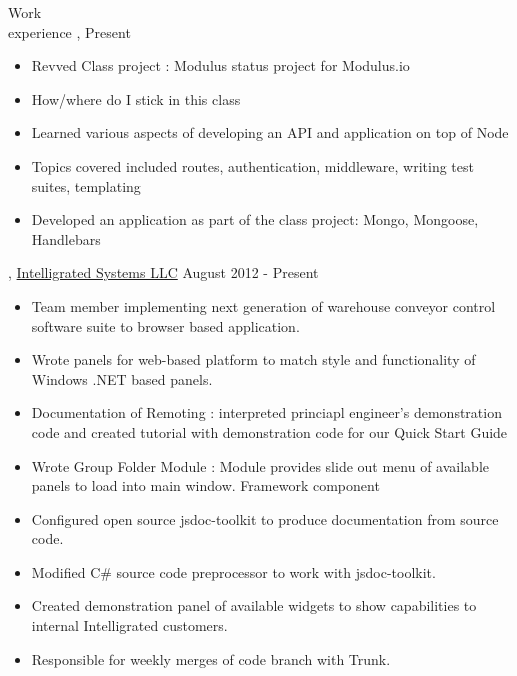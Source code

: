 \begin{category}{Work \\experience}
, Present
\begin{itemize}
\item Revved Class project : Modulus status project for Modulus.io 
\item How/where do I stick in this class
\item Learned various aspects of developing an API and application on top of Node
\item Topics covered included routes, authentication, middleware, writing test suites, templating
\item Developed an application as part of the class project: Mongo, Mongoose, Handlebars
\end{itemize}

, \href{http://www.intelligrated.com}{Intelligrated Systems LLC} August 2012 - Present
\begin{itemize}
\item Team member implementing next generation of warehouse conveyor control software suite to browser based application.
\item Wrote panels for web-based platform to match style and functionality of Windows .NET based panels. 
\item Documentation of Remoting : interpreted princiapl engineer's demonstration code and created tutorial with demonstration code for our Quick Start Guide
\item Wrote Group Folder Module : Module provides slide out menu of available panels to load into main window. Framework component

\item Configured open source jsdoc-toolkit to produce documentation from source code.
\item Modified C\# source code preprocessor to work with jsdoc-toolkit.
\item Created demonstration panel of available widgets to show capabilities to internal Intelligrated customers. 
\item Responsible for weekly merges of code branch with Trunk.


\end{itemize}
\end{category}
